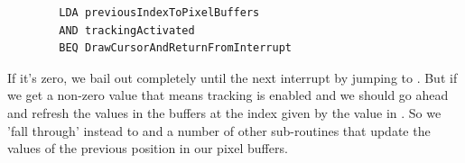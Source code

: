 \begin{lstlisting}
        LDA previousIndexToPixelBuffers
        AND trackingActivated
        BEQ DrawCursorAndReturnFromInterrupt
\end{lstlisting}

If it's zero, we bail out
completely until the next interrupt by jumping to .
But if we get a non-zero value that means tracking is enabled and 
we should go ahead and refresh the values in the buffers at the index given
by the value in . So we 'fall through' instead to
 and a number of other sub-routines that update the
values of the previous position in our pixel buffers.
\clearpage

